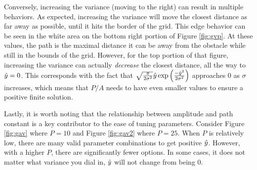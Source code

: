 Conversely, increasing the variance (moving to the right) can result in multiple behaviors. As expected, increasing the variance will move the closest distance as far away as possible, until it hits the border of the grid. This edge behavior can be seen in the white area on the bottom right portion of Figure \ref{fig:gvp}. At these values, the path is the maximal distance it can be away from the obstacle while still in the bounds of the grid. However, for the top portion of that figure, increasing the variance can actually \emph{decrease} the closest distance, all the way to $\hat{y}=0$. This corresponds with the fact that $ \sqrt{\frac{\pi}{2\sigma^2}} \hat{y} \exp\Big( \frac{-\hat{y}^2}{2\sigma^2} \Big) $ approaches 0 as $\sigma$ increases, which means that $P/A$ needs to have even smaller values to ensure a positive finite solution. 

Lastly, it is worth noting that the relationship between amplitude and path constant is a key contributor to the ease of tuning parameters. Consider Figure \ref{fig:gav} where $P=10$ and Figure \ref{fig:gav2} where $P=25$. When $P$ is relatively low, there are many valid parameter combinations to get positive $\hat{y}$. However, with a higher $P$, there are significantly fewer options. In some cases, it does not matter what variance you dial in, $\hat{y}$ will not change from being 0. 

